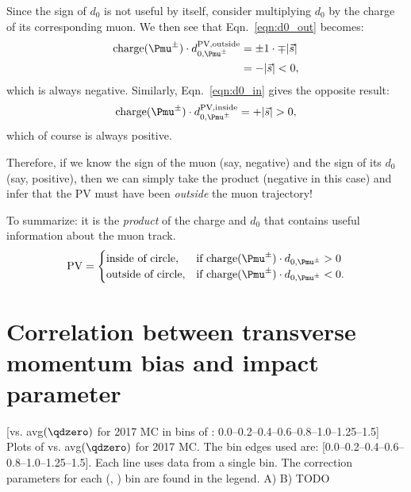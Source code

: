 Since the sign of $d_0$ is not useful by itself, consider multiplying $d_0$ by the charge of its corresponding muon. 
We then see that Eqn.~\ref{eqn:d0_out} becomes:
\begin{align*}
    {\rm charge}(\Pmu^{\pm}) \cdot d_{0,\Pmu^{\pm}}^{\text{PV,outside}} &= \pm1 \cdot \mp \lvert \vec{s} \rvert \\
    &= - \lvert \vec{s} \rvert < 0,
\end{align*}
which is always negative. Similarly, Eqn.~\ref{eqn:d0_in} gives the opposite result:
\begin{equation*}
    {\rm charge}(\Pmu^{\pm}) \cdot d_{0,\Pmu^{\pm}}^{\text{PV,inside}} = + \lvert \vec{s} \rvert > 0,
\end{equation*}
which of course is always positive. 

Therefore, if we know the sign of the muon (say, negative) 
and the sign of its $d_0$ (say, positive), 
then we can simply take the product (negative in this case) 
and infer that the PV must have been \emph{outside} the muon trajectory!

To summarize: it is the \emph{product} of the charge and $d_0$ that contains useful information about the muon track. 
\[
    {\rm PV} = 
\begin{cases}
    \text{inside of circle},& \text{if charge}(\Pmu^{\pm}) \cdot d_{0,\Pmu^{\pm}} > 0 \\
    \text{outside of circle},& \text{if charge}(\Pmu^{\pm}) \cdot d_{0,\Pmu^{\pm}} < 0.
\end{cases}
\]
\chapter{Correlation between transverse momentum bias and impact parameter}
\begin{multiFigure}
    \centering
        [\pTmismeas vs. avg$(\qdzero)$ for 2017 MC in bins of \abseta: 0.0--0.2--0.4--0.6--0.8--1.0--1.25--1.5]
        {Plots of \pTmismeas vs. avg$(\qdzero)$ for 2017 MC.
        The \abseta bin edges used are: [0.0--0.2--0.4--0.6--0.8--1.0--1.25--1.5].
        Each line uses data from a single \pT bin. 
        The \pT correction parameters for each (\abseta, \pT) bin are found in the legend.
        \;A) 
        \;B) TODO}
\end{multiFigure}

